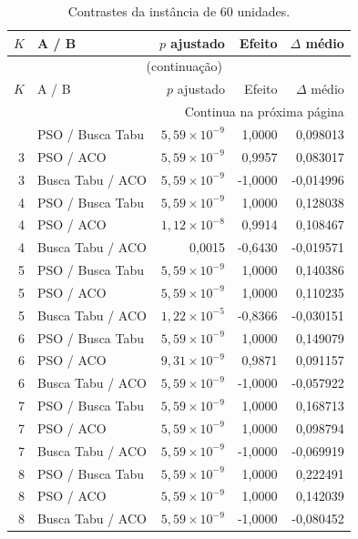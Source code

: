 \begingroup\small
\setlength{\tabcolsep}{5pt}
\begin{longtable}{rlrrr}
\caption{Contrastes da instância de 60 unidades.}\label{tab:contrastes-60}\\
\toprule
$K$ & A / B & $p$ ajustado & Efeito & $\Delta$ médio \\
\midrule
\endfirsthead
\multicolumn{5}{c}{\tablename~\thetable{} (continuação)}\\
\toprule
$K$ & A / B & $p$ ajustado & Efeito & $\Delta$ médio \\
\midrule
\endhead
\midrule\multicolumn{5}{r}{Continua na próxima página}\\
\endfoot
\bottomrule
\endlastfoot
3 & PSO / Busca Tabu & $5{,}59\times10^{-9}$ & 1,0000 & 0,098013 \\
3 & PSO / ACO & $5{,}59\times10^{-9}$ & 0,9957 & 0,083017 \\
3 & Busca Tabu / ACO & $5{,}59\times10^{-9}$ & -1,0000 & -0,014996 \\
4 & PSO / Busca Tabu & $5{,}59\times10^{-9}$ & 1,0000 & 0,128038 \\
4 & PSO / ACO & $1{,}12\times10^{-8}$ & 0,9914 & 0,108467 \\
4 & Busca Tabu / ACO & 0,0015 & -0,6430 & -0,019571 \\
5 & PSO / Busca Tabu & $5{,}59\times10^{-9}$ & 1,0000 & 0,140386 \\
5 & PSO / ACO & $5{,}59\times10^{-9}$ & 1,0000 & 0,110235 \\
5 & Busca Tabu / ACO & $1{,}22\times10^{-5}$ & -0,8366 & -0,030151 \\
6 & PSO / Busca Tabu & $5{,}59\times10^{-9}$ & 1,0000 & 0,149079 \\
6 & PSO / ACO & $9{,}31\times10^{-9}$ & 0,9871 & 0,091157 \\
6 & Busca Tabu / ACO & $5{,}59\times10^{-9}$ & -1,0000 & -0,057922 \\
7 & PSO / Busca Tabu & $5{,}59\times10^{-9}$ & 1,0000 & 0,168713 \\
7 & PSO / ACO & $5{,}59\times10^{-9}$ & 1,0000 & 0,098794 \\
7 & Busca Tabu / ACO & $5{,}59\times10^{-9}$ & -1,0000 & -0,069919 \\
8 & PSO / Busca Tabu & $5{,}59\times10^{-9}$ & 1,0000 & 0,222491 \\
8 & PSO / ACO & $5{,}59\times10^{-9}$ & 1,0000 & 0,142039 \\
8 & Busca Tabu / ACO & $5{,}59\times10^{-9}$ & -1,0000 & -0,080452 \\
\end{longtable}
\endgroup

